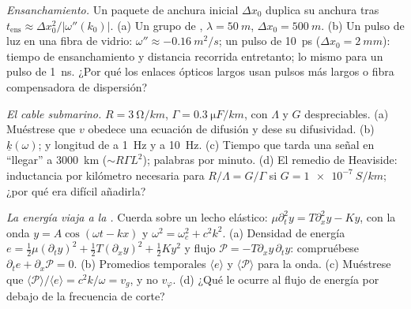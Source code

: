 \begin{exercise}[$\star\star$]\label{exo:b2:dispersion-wave-packets:8}
\emph{Ensanchamiento.} Un paquete de anchura inicial $\Delta x_0$ duplica su anchura
tras $t_{\text{ens}} \approx \Delta x_0^2/|\omega''(k_0)|$. (a) Un grupo de , $\lambda = \qty{50}{m}$, $\Delta x_0 = \qty{500}{m}$. (b) Un pulso de luz en
una fibra de vidrio: $\omega'' \approx \qty{-0.16}{m^2/s}$; un pulso de \qty{10}{ps} ($\Delta x_0 =
\qty{2}{mm}$): tiempo de ensanchamiento y distancia recorrida entretanto; lo mismo
para un pulso de \qty{1}{ns}. ¿Por qué los enlaces ópticos largos usan
pulsos más largos o fibra compensadora de dispersión?
\end{exercise}

\begin{exercise}[$\star\star$]\label{exo:b2:dispersion-wave-packets:9}
\emph{El cable submarino.} $R = \qty{3}{\ohm/km}$, $\Gamma = \qty{0.3}{\micro F/km}$,
con $\Lambda$ y $G$ despreciables. (a) Muéstrese que $v$ obedece una ecuación de difusión y
dese su difusividad. (b)  $\underline k(\omega)$;  y longitud de  a \qty{1}{Hz} y a \qty{10}{Hz}. (c)
Tiempo que tarda una señal en ``llegar'' a \qty{3000}{km} ($\sim R\Gamma L^2$); palabras por
minuto. (d) El remedio de Heaviside: inductancia por kilómetro necesaria para
$R/\Lambda = G/\Gamma$ si $G = \qty{1e-7}{S/km}$; ¿por qué era difícil añadirla?
\end{exercise}

\begin{exercise}[$\star\star\star$]\label{exo:b2:dispersion-wave-packets:10}
\emph{La energía viaja a la .} Cuerda sobre un lecho elástico:
$\mu\partial_t^2y = T\partial_x^2y - Ky$, con la onda $y = A\cos(\omega t - kx)$ y $\omega^2 =
\omega_c^2 + c^2k^2$. (a) Densidad de energía $e = \tfrac12\mu(\partial_ty)^2 + \tfrac12T
(\partial_xy)^2 + \tfrac12Ky^2$ y flujo $\mathcal P = -T\partial_xy\,\partial_ty$: compruébese
$\partial_te + \partial_x\mathcal P = 0$. (b) Promedios temporales $\langle e\rangle$ y
$\langle\mathcal P\rangle$ para la onda. (c) Muéstrese que $\langle\mathcal P\rangle/
\langle e\rangle = c^2k/\omega = v_g$, y no $v_\varphi$. (d) ¿Qué le ocurre al
flujo de energía por debajo de la frecuencia de corte?
\end{exercise}

